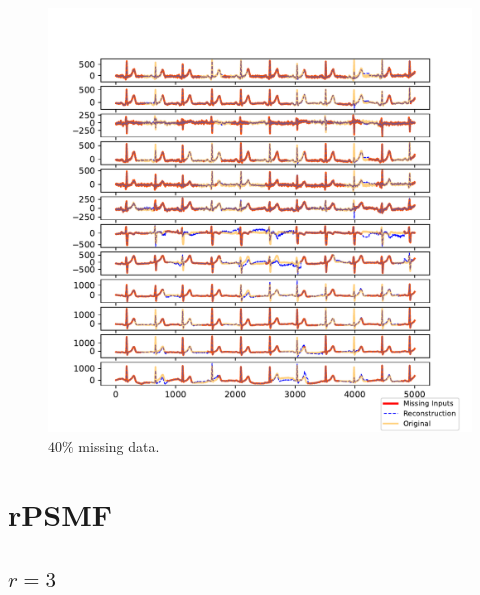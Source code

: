 \documentclass{mldsmsc}
\begin{document}
\begin{figure}[H]
\vspace{1em} %

\begin{minipage}{0.4\linewidth}
    \centering
    \includegraphics[width=\linewidth]{images/missing/psmf_output_40_10.pdf}
    \caption{$40\%$ missing data.}
\end{minipage}
\end{figure}

\section{rPSMF}

\subsection{$r = 3$}
\end{document}
